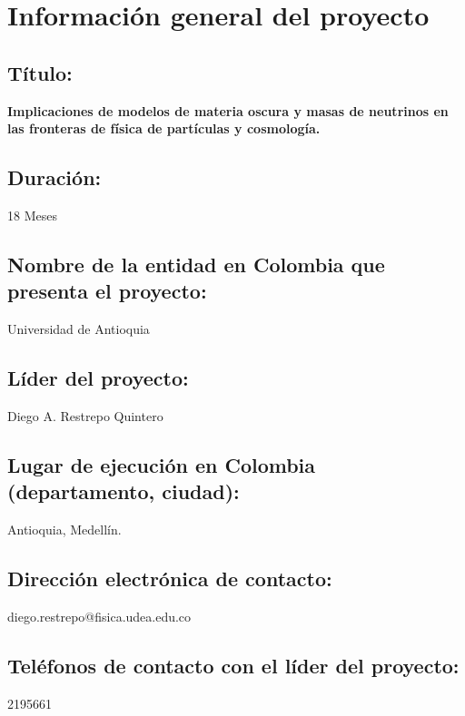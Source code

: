 
\section{Información general del proyecto}
\subsection{Título:}
\textbf{Implicaciones de modelos de materia oscura y masas de neutrinos en las fronteras de física de partículas y cosmología.}
\subsection{Duración: }
18 Meses
\subsection{Nombre de la entidad en Colombia que presenta el proyecto:}
Universidad de Antioquia
\subsection{Líder del proyecto: }
Diego A. Restrepo Quintero
\subsection{Lugar de ejecución en Colombia (departamento, ciudad): }
Antioquia, Medellín.
\subsection{Dirección electrónica de contacto:}
diego.restrepo@fisica.udea.edu.co
\subsection{Teléfonos de contacto con el líder del proyecto: }
2195661


